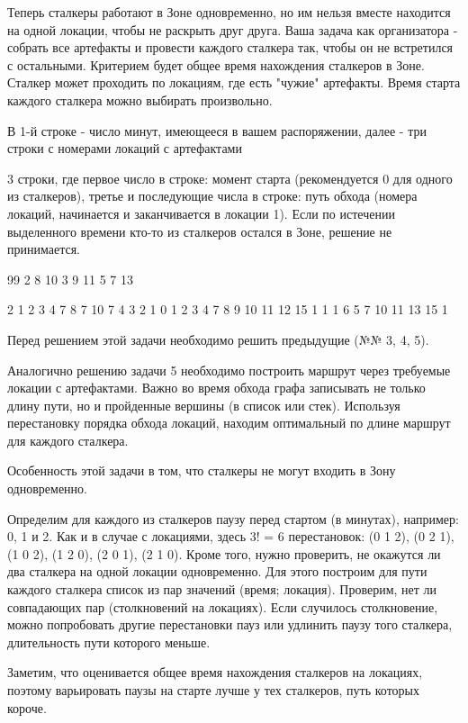 
Теперь сталкеры работают в Зоне одновременно, но им нельзя вместе находится на одной локации, чтобы не раскрыть друг друга. Ваша задача как организатора - собрать все артефакты и провести каждого сталкера так, чтобы он не встретился с остальными. Критерием будет общее время нахождения сталкеров в Зоне. Сталкер может проходить по локациям, где есть "чужие" артефакты. Время старта каждого сталкера можно выбирать произвольно.


В 1-й строке - число минут, имеющееся в вашем распоряжении, далее - три строки с номерами локаций с артефактами

\outputfmtSection

3 строки, где первое число в строке: момент старта (рекомендуется 0 для одного из сталкеров), третье и последующие числа в строке: путь обхода (номера локаций, начинается и заканчивается в локации 1). Если по истечении выделенного времени кто-то из сталкеров остался в Зоне, решение не принимается.

\begin{myverbbox}[\small]{\vinput}
    99
    2 8 10
    3 9 11
    5 7 13
\end{myverbbox}
\begin{myverbbox}[\small]{\voutput}
    2 1 2 3 4 7 8 7 10 7 4 3 2 1
    0 1 2 3 4 7 8 9 10 11 12 15 1
    1 1 6 5 7 10 11 13 15 1
\end{myverbbox}

\explanationSection

Перед решением этой задачи необходимо решить предыдущие (№№ 3, 4, 5).

Аналогично решению задачи 5 необходимо построить маршрут через требуемые локации с артефактами. Важно во время обхода графа записывать не только длину пути, но и пройденные вершины (в список или стек). Используя перестановку порядка обхода локаций, находим оптимальный по длине маршрут для каждого сталкера.

Особенность этой задачи в том, что сталкеры не могут входить в Зону одновременно.

Определим для каждого из сталкеров паузу перед стартом (в минутах), например: 0, 1 и 2. Как и в случае с локациями, здесь 3! = 6 перестановок: (0 1 2), (0 2 1), (1 0 2), (1 2 0), (2 0 1), (2 1 0). Кроме того, нужно проверить, не окажутся ли два сталкера на одной локации одновременно. Для этого построим для пути каждого сталкера список из пар значений (время; локация). Проверим, нет ли совпадающих пар (столкновений на локациях). Если случилось столкновение, можно попробовать другие перестановки пауз или удлинить паузу того сталкера, длительность пути которого меньше.

Заметим, что оценивается общее время нахождения сталкеров на локациях, поэтому варьировать паузы на старте лучше у тех сталкеров, путь которых короче.
